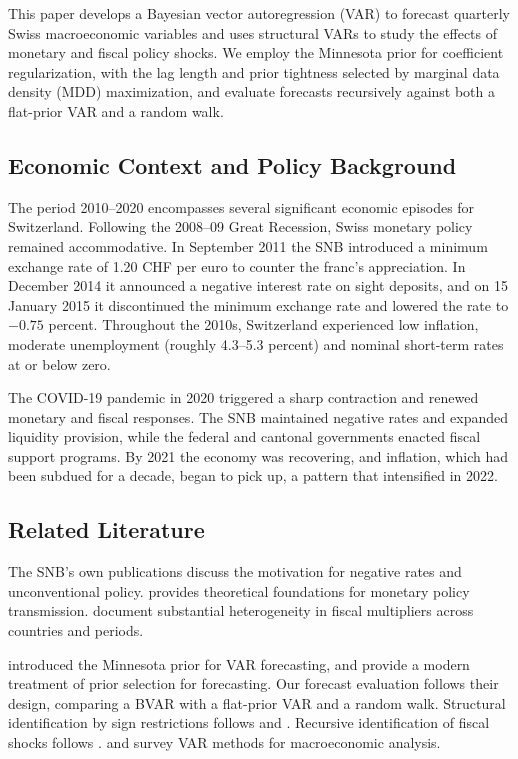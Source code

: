 \documentclass[11pt]{article}
\begin{document}
This paper develops a Bayesian vector autoregression (VAR) to forecast quarterly Swiss macroeconomic variables and uses structural VARs to study the effects of monetary and fiscal policy shocks. We employ the Minnesota prior for coefficient regularization, with the lag length and prior tightness selected by marginal data density (MDD) maximization, and evaluate forecasts recursively against both a flat-prior VAR and a random walk.

\subsection{Economic Context and Policy Background}

The period 2010--2020 encompasses several significant economic episodes for Switzerland. Following the 2008--09 Great Recession, Swiss monetary policy remained accommodative. In September 2011 the SNB introduced a minimum exchange rate of 1.20 CHF per euro to counter the franc's appreciation. In December 2014 it announced a negative interest rate on sight deposits, and on 15 January 2015 it discontinued the minimum exchange rate and lowered the rate to $-0.75$ percent. Throughout the 2010s, Switzerland experienced low inflation, moderate unemployment (roughly 4.3--5.3 percent) and nominal short-term rates at or below zero.

The COVID-19 pandemic in 2020 triggered a sharp contraction and renewed monetary and fiscal responses. The SNB maintained negative rates and expanded liquidity provision, while the federal and cantonal governments enacted fiscal support programs. By 2021 the economy was recovering, and inflation, which had been subdued for a decade, began to pick up, a pattern that intensified in 2022.

\subsection{Related Literature}

The SNB's own publications \citep{snb2015,snb2020} discuss the motivation for negative rates and unconventional policy. \citet{woodford2003} provides theoretical foundations for monetary policy transmission. \citet{blanchardleigh2013} document substantial heterogeneity in fiscal multipliers across countries and periods.

\citet{litterman1986} introduced the Minnesota prior for VAR forecasting, and \citet{glp2015} provide a modern treatment of prior selection for forecasting. Our forecast evaluation follows their design, comparing a BVAR with a flat-prior VAR and a random walk. Structural identification by sign restrictions follows \citet{canova2002} and \citet{uhlig2005}. Recursive identification of fiscal shocks follows \citet{blanchardperotti2002}. \citet{stockwatson2001} and \citet{delnegro2011} survey VAR methods for macroeconomic analysis.
\end{document}
